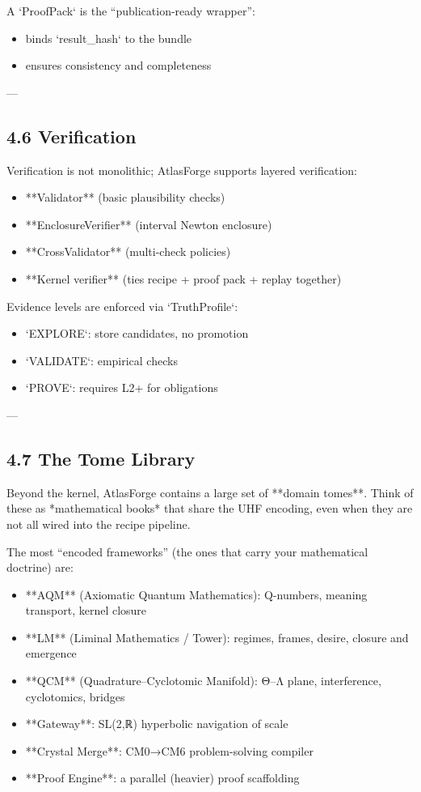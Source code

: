 \documentclass[11pt]{article}
\begin{document}
A `ProofPack` is the “publication-ready wrapper”:
\begin{itemize}
\item binds `result\_hash` to the bundle
\item ensures consistency and completeness
\end{itemize}

---

\subsection{4.6 Verification}

Verification is not monolithic; AtlasForge supports layered verification:

\begin{itemize}
\item **Validator** (basic plausibility checks)
\item **EnclosureVerifier** (interval Newton enclosure)
\item **CrossValidator** (multi-check policies)
\item **Kernel verifier** (ties recipe + proof pack + replay together)
\end{itemize}

Evidence levels are enforced via `TruthProfile`:
\begin{itemize}
\item `EXPLORE`: store candidates, no promotion
\item `VALIDATE`: empirical checks
\item `PROVE`: requires L2+ for obligations
\end{itemize}

---



\subsection{4.7 The Tome Library}

Beyond the kernel, AtlasForge contains a large set of **domain tomes**.  
Think of these as *mathematical books* that share the UHF encoding, even when they are not all wired into the recipe pipeline.

The most “encoded frameworks” (the ones that carry your mathematical doctrine) are:

\begin{itemize}
\item **AQM** (Axiomatic Quantum Mathematics): Q-numbers, meaning transport, kernel closure
\item **LM** (Liminal Mathematics / Tower): regimes, frames, desire, closure and emergence
\item **QCM** (Quadrature–Cyclotomic Manifold): Θ–Λ plane, interference, cyclotomics, bridges
\item **Gateway**: SL(2,ℝ) hyperbolic navigation of scale
\item **Crystal Merge**: CM0→CM6 problem-solving compiler
\item **Proof Engine**: a parallel (heavier) proof scaffolding
\end{itemize}
\end{document}
